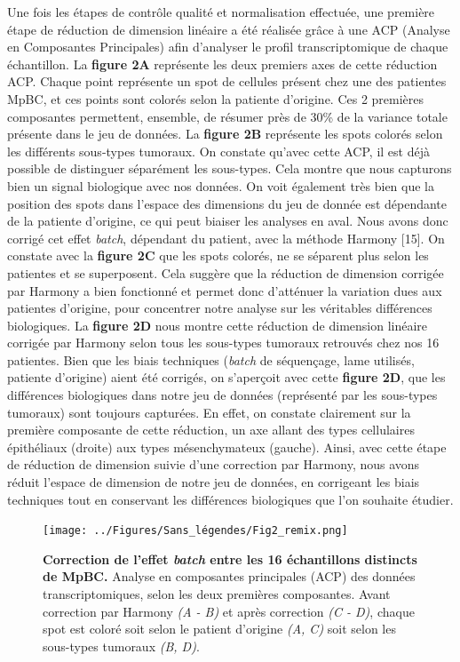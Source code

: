 \documentclass[11pt]{article}
\begin{document}
Une fois les étapes de contrôle qualité et normalisation effectuée, une première étape de réduction de dimension linéaire a été réalisée grâce à une ACP (Analyse en Composantes Principales) afin d’analyser le profil transcriptomique de chaque échantillon. La \textbf{figure 2A} représente les deux premiers axes de cette réduction ACP. Chaque point représente un spot de cellules présent chez une des patientes MpBC, et ces points sont colorés selon la patiente d’origine. Ces 2 premières composantes permettent, ensemble, de résumer près de 30\% de la variance totale présente dans le jeu de données. La \textbf{figure 2B} représente les spots colorés selon les différents sous-types tumoraux. On constate qu’avec cette ACP, il est déjà possible de distinguer séparément les sous-types. Cela montre que nous capturons bien un signal biologique avec nos données. On voit également très bien que la position des spots dans l’espace des dimensions du jeu de donnée est dépendante de la patiente d’origine, ce qui peut biaiser les analyses en aval. Nous avons donc corrigé cet effet \textit{batch}, dépendant du patient, avec la méthode Harmony  [15]. On constate avec la \textbf{figure 2C} que les spots colorés, ne se séparent plus selon les patientes et se superposent. Cela suggère que la réduction de dimension corrigée par Harmony a bien fonctionné et permet donc d’atténuer la variation dues aux patientes d’origine, pour concentrer notre analyse sur les véritables différences biologiques. La \textbf{figure 2D} nous montre cette réduction de dimension linéaire corrigée par Harmony selon tous les sous-types tumoraux retrouvés chez nos 16 patientes. Bien que les biais techniques (\textit{batch} de séquençage, lame utilisés, patiente d’origine) aient été corrigés, on s’aperçoit avec cette \textbf{figure 2D}, que les différences biologiques dans notre jeu de données (représenté par les sous-types tumoraux) sont toujours capturées. En effet, on constate clairement sur la première composante de cette réduction, un axe allant des types cellulaires épithéliaux (droite) aux types mésenchymateux (gauche). Ainsi, avec cette étape de réduction de dimension suivie d’une correction par Harmony, nous avons réduit l’espace de dimension de notre jeu de données, en corrigeant les biais techniques tout en conservant les différences biologiques que l’on souhaite étudier.

\begin{figure}[H]
    \centering
    \texttt{[image: ../Figures/Sans\_légendes/Fig2\_remix.png]}
    \caption[\textbf{Figure 2 : Correction de l’effet \textit{batch} entre les 16 échantillons distincts de MpBC.}]{\footnotesize \textbf{Correction de l’effet \textit{batch} entre les 16 échantillons distincts de MpBC.}  Analyse en composantes principales (ACP) des données transcriptomiques, selon les deux premières composantes. Avant correction par Harmony \textit{(A - B)} et après correction \textit{(C - D)}, chaque spot est coloré soit selon le patient d’origine \textit{(A, C)} soit selon les sous-types tumoraux \textit{(B, D)}.}
    \label{fig:fig2}
\end{figure}
\end{document}
